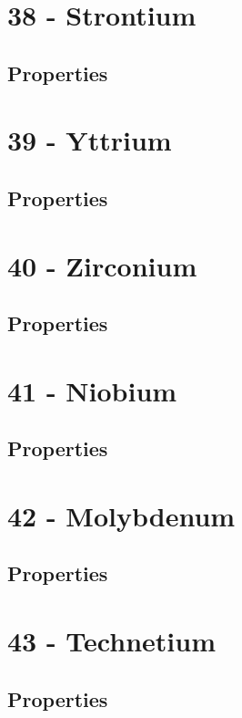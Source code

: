 \documentclass{book}
\begin{document}
\section{38 - Strontium}
\label{sec:elem-strontium}
\subsection{Properties}

\section{39 - Yttrium}
\label{sec:elem-yttrium}
\subsection{Properties}

\section{40 - Zirconium}
\label{sec:elem-zirconium}
\subsection{Properties}

\section{41 - Niobium}
\label{sec:elem-niobium}
\subsection{Properties}

\section{42 - Molybdenum}
\label{sec:elem-molybdenum}
\subsection{Properties}

\section{43 - Technetium}
\label{sec:elem-technetium}
\subsection{Properties}
\end{document}
